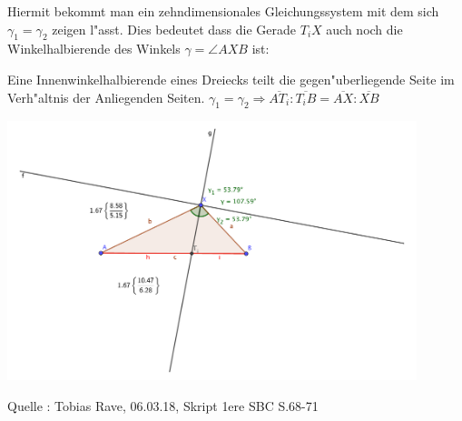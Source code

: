 \begin{small}
\begin{mdframed}
Hiermit bekommt man ein zehndimensionales Gleichungssystem mit dem sich $\gamma_{1} = \gamma_{2}$ zeigen l"asst. Dies bedeutet dass die Gerade $T_{i}X$ auch noch die Winkelhalbierende des Winkels $\gamma = \angle AXB$ ist:
\\
\end{mdframed}
\begin{Definition}
Eine Innenwinkelhalbierende eines Dreiecks teilt die gegen"uberliegende Seite im Verh"altnis der Anliegenden Seiten. \qquad $\gamma_{1}=\gamma_{2} \Rightarrow \overline{AT_{i}}:\overline{T_{i}B}=\overline{AX}:\overline{XB}$
\end{Definition}
 \begin{center}
\includegraphics[width=4.7in]{Apollinus_Winkelhalbierende_Bild}
\end{center}
\end{small}
\begin{tiny}
  Quelle : Tobias Rave, 06.03.18, Skript 1ere SBC S.68-71
\end{tiny}
